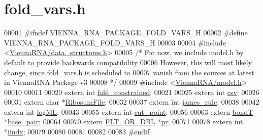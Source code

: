 \hypertarget{fold__vars_8h_source}{}\section{fold\+\_\+vars.\+h}
\label{fold__vars_8h_source}

\begin{DoxyCode}
00001 \textcolor{preprocessor}{#ifndef VIENNA\_RNA\_PACKAGE\_FOLD\_VARS\_H}
00002 \textcolor{preprocessor}{#define VIENNA\_RNA\_PACKAGE\_FOLD\_VARS\_H}
00003 
00004 \textcolor{preprocessor}{#include <\hyperlink{data__structures_8h}{ViennaRNA/data\_structures.h}>}
00005 \textcolor{comment}{/*  For now, we include model.h by default to provide backwards compatibility}
00006 \textcolor{comment}{    However, this will most likely change, since fold\_vars.h is scheduled to}
00007 \textcolor{comment}{    vanish from the sources at latest in ViennaRNA Package v3}
00008 \textcolor{comment}{*/}
00009 \textcolor{preprocessor}{#include <\hyperlink{model_8h}{ViennaRNA/model.h}>}
00010 
00011 
00020 \textcolor{keyword}{extern} \textcolor{keywordtype}{int}    \hyperlink{fold__vars_8h_a0afc287c2464866d94858c39175154af}{fold\_constrained};
00021 
00025 \textcolor{keyword}{extern} \textcolor{keywordtype}{int}  \hyperlink{fold__vars_8h_af2763d55a74663a5e60652b8880baa5b}{csv};
00026 
00031 \textcolor{keyword}{extern} \textcolor{keywordtype}{char} *\hyperlink{fold__vars_8h_a5dbaa0cca2c8c82048a0f0e38e164944}{RibosumFile};   
00032 
00037 \textcolor{keyword}{extern} \textcolor{keywordtype}{int}  \hyperlink{fold__vars_8h_af349001ad3b4d008d0051d935b1b6261}{james\_rule};
00038 
00042 \textcolor{keyword}{extern} \textcolor{keywordtype}{int}  \hyperlink{fold__vars_8h_a80c3c5fd35e7479704cc91d2d0367743}{logML};
00043 
00055 \textcolor{keyword}{extern} \textcolor{keywordtype}{int}  \hyperlink{fold__vars_8h_ab9b2c3a37a5516614c06d0ab54b97cda}{cut\_point};
00056 
00063 \textcolor{keyword}{extern} \hyperlink{group__data__structures_structvrna__bp__stack__s}{bondT}  *\hyperlink{fold__vars_8h_a0244a629b5ab4f58b77590c3dfd130dc}{base\_pair};
00064 
00070 \textcolor{keyword}{extern} \hyperlink{group__data__structures_ga31125aeace516926bf7f251f759b6126}{FLT\_OR\_DBL} *\hyperlink{fold__vars_8h_ac98ec419070aee6831b44e5c700f090f}{pr};
00071 
00078 \textcolor{keyword}{extern} \textcolor{keywordtype}{int}   *\hyperlink{fold__vars_8h_a92089ae3a51b5d75a14ce9cc29cc8317}{iindx};
00079 
00080 
00081 
00082 
00083 \textcolor{preprocessor}{#endif}
\end{DoxyCode}
